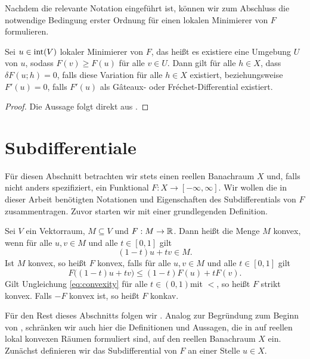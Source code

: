 Nachdem die relevante Notation eingeführt ist, können wir zum Abschluss
die notwendige Bedingung erster Ordnung für einen lokalen Minimierer von $F$
formulieren.

\begin{theorem}
  \label{thm:necessaryConditionFreeLocalExtrema}
  Sei $u\in \operatorname{int}(V)$ lokaler Minimierer von $F$, das heißt
  es existiere eine Umgebung 
  $U$ von $u$, sodass $F(v)\geq F(u)$ für alle $v\in U$. Dann gilt für alle
  $h\in X$, dass $\delta F(u;h) = 0$, falls diese Variation für alle $h\in X$
  existiert, beziehungsweise $F'(u) = 0$, falls $F'(u)$ als 
  G\^ateaux- oder Fr\'echet-Differential existiert.
\end{theorem}

\begin{proof}
  Die Aussage folgt direkt aus \cite[S. 193 f., Theorem 40.A, Theorem
  40.B]{Zei85}.
\end{proof}


\section{Subdifferentiale}

Für diesen Abschnitt betrachten wir stets einen reellen Banachraum $X$ und,
falls nicht anders spezifiziert, ein Funktional $F:X\to [-\infty,\infty]$.
Wir wollen die in dieser Arbeit benötigten Notationen und
Eigenschaften des Subdifferentials von $F$ zusammentragen.
Zuvor starten wir mit einer grundlegenden Definition.

\begin{definition}
  Sei $V$ ein Vektorraum, $M\subseteq V$ und $F:M\to\mathbb{R}$. 
  Dann heißt die Menge $M$ konvex, wenn für alle $u,v\in M$ und alle $t\in
  [0,1]$ gilt $$(1-t)u+tv\in M.$$
  Ist $M$ konvex, so heißt $F$ konvex, falls für alle $u,v\in M$ und alle
  $t\in[0,1]$ gilt 
  \begin{equation}
    \label{eq:convexity}
    F\big( (1-t)u+tv\big)\leq (1-t)F(u)+t F(v).
  \end{equation}
  Gilt Ungleichung \eqref{eq:convexity} für alle $t\in
  (0,1)$mit \glqq$<$\grqq, so heißt $F$ strikt konvex. 
  Falls $-F$ konvex ist, so heißt $F$ konkav.
\end{definition}

Für den Rest dieses Abschnitts folgen wir \cite[S. 385-397]{Zei85}. 
Analog zur Begründung zum Beginn von , schränken
wir auch hier die Definitionen und Aussagen, die in \cite{Zei85} auf reellen
lokal konvexen Räumen formuliert sind, auf den reellen Banachraum $X$ ein.
Zunächst definieren wir das Subdifferential von $F$ an einer Stelle $u\in X$.


